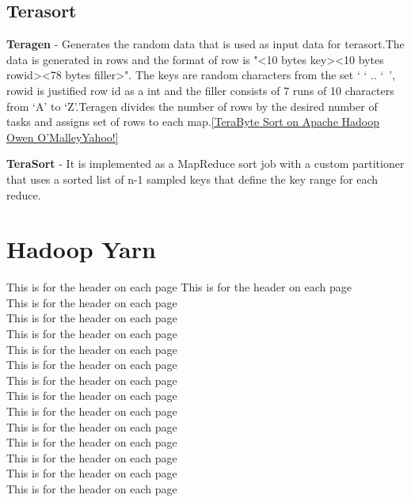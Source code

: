 
\subsection{Terasort}

\textbf{Teragen} - Generates the random data that is used as input data for terasort.The data is generated in rows and the format of 
row is "<10 bytes key><10 bytes rowid><78 bytes filler>". 
The keys are random characters from the set ‘ ‘ .. ‘~’, rowid is justified row id as a int and the filler consists of 7 runs of 10 characters from ‘A’ to ‘Z’.Teragen divides the number of rows by the desired number of tasks and assigns set of rows to each map.\ref{TeraByte Sort on Apache Hadoop Owen O’MalleyYahoo!}


\textbf{TeraSort} - It is implemented as a MapReduce sort job with a custom partitioner that uses a sorted list of n-1 sampled keys that define the key range for each reduce.



\section{Hadoop Yarn}
This is for the header on each page
This is for the header on each page\\
This is for the header on each page\\
This is for the header on each page\\
This is for the header on each page\\
This is for the header on each page\\
This is for the header on each page\\
This is for the header on each page\\
This is for the header on each page\\
This is for the header on each page\\
This is for the header on each page\\
This is for the header on each page\\
This is for the header on each page\\
This is for the header on each page\\
This is for the header on each page
